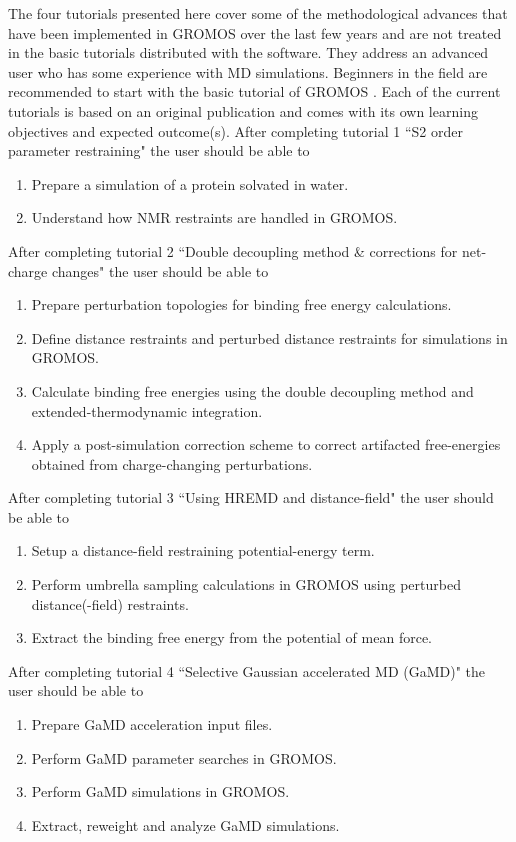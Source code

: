 The four tutorials presented here cover some of the methodological advances that have been implemented in GROMOS over the last few years and are not treated in the basic tutorials distributed with the software. 
They address an advanced user who has some experience with MD simulations. Beginners in the field are recommended to start with the basic tutorial of GROMOS \cite{volume_7}. Each of the current tutorials is based on an original publication and comes with its own learning objectives and expected outcome(s). 
After completing tutorial 1 ``S2 order parameter restraining" the user should be able to
\begin{enumerate}
\item Prepare a simulation of a protein solvated in water.
\item Understand how NMR restraints are handled in GROMOS.
\end{enumerate}
%
After completing tutorial 2 ``Double decoupling method \& corrections for net-charge changes" the user should be able to
\begin{enumerate}
\item Prepare perturbation topologies for binding free energy calculations.
\item Define distance restraints and perturbed distance restraints for simulations in GROMOS.
\item Calculate binding free energies using the double decoupling method and extended-thermodynamic integration.
\item Apply a post-simulation correction scheme to correct artifacted free-energies obtained from charge-changing perturbations.
\end{enumerate}
%
After completing tutorial 3 ``Using HREMD and distance-field" the user should be able to
\begin{enumerate}
\item Setup a distance-field restraining potential-energy term.
\item Perform umbrella sampling calculations in GROMOS using perturbed distance(-field) restraints.
\item Extract the binding free energy from the potential of mean force.
\end{enumerate}
%
After completing tutorial 4 ``Selective Gaussian accelerated MD (GaMD)" the user should be able to
\begin{enumerate}
\item Prepare GaMD acceleration input files.
\item Perform GaMD parameter searches in GROMOS.
\item Perform GaMD simulations in GROMOS.
\item Extract, reweight and analyze GaMD simulations.
\end{enumerate}
